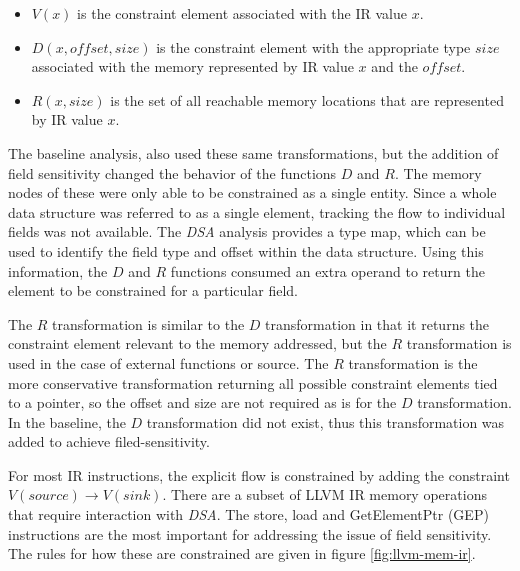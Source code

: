    \begin{itemize}
   \item $V(x)$ is the constraint element associated with the IR value $x$.
   \item $D(x, offset, size)$ is the constraint element with the appropriate
     type $size$ associated with the memory represented by IR value $x$ and the
     $offset$.
   \item $R(x, size)$ is the set of all reachable memory locations that are
     represented by IR value $x$.
   \end{itemize}

   The baseline analysis, also used these same transformations, but the addition
   of field sensitivity changed the behavior of the functions $D$ and $R$. The
   memory nodes of these were only able to be constrained as a single entity.
   Since a whole data structure was referred to as a single element, tracking
   the flow to individual fields was not available. The \textit{DSA} analysis
   provides a type map, which can be used to identify the field type and offset
   within the data structure. Using this information, the $D$ and $R$ functions
   consumed an extra operand to return the element to be constrained for a
   particular field.

   The $R$ transformation is similar to the $D$ transformation in that it
   returns the constraint element relevant to the memory addressed, but the $R$
   transformation is used in the case of external functions or source. The $R$
   transformation is the more conservative transformation returning all possible
   constraint elements tied to a pointer, so the offset and size are not
   required as is for the $D$ transformation. In the baseline, the $D$
   transformation did not exist, thus this transformation was added to achieve
   filed-sensitivity.
   
   For most IR instructions, the explicit flow is constrained by adding the
   constraint $V(source) \rightarrow V(sink)$. There are a subset of LLVM IR
   memory operations that require interaction with \textit{DSA}. The
   store, load and GetElementPtr (GEP) instructions are the most important for
   addressing the issue of field sensitivity. The rules for how these are
   constrained are given in figure \ref{fig:llvm-mem-ir}.

